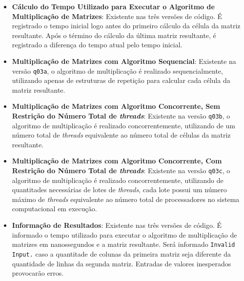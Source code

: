\begin{itemize}
{\begin{itemize}
{\begin{enumerate}
				\item{Com o tamanho da matriz $B$ definido, devem ser fornecidos $p \times q$ números inteiros. Tais números são os valores contidos na matriz $B$.}
			\end{enumerate}}
			\item{\textbf{Cálculo do Tempo Utilizado para Executar o Algoritmo de Multiplicação de Matrizes}: Existente nas três versões de código. É registrado o tempo inicial logo antes do primeiro cálculo da célula da matriz resultante. Após o término do cálculo da última matriz resultante, é registrado a diferença do tempo atual pelo tempo inicial.}
			\item{\textbf{Multiplicação de Matrizes com Algoritmo Sequencial}: Existente na versão \texttt{q03a}, o algoritmo de multiplicação é realizado sequencialmente, utilizando apenas de estruturas de repetição para calcular cada célula da matriz resultante.}
			\item{\textbf{Multiplicação de Matrizes com Algoritmo Concorrente, Sem Restrição do Número Total de \emph{threads}}: Existente na versão \texttt{q03b}, o algoritmo de multiplicação é realizado concorrentemente, utilizando de um número total de \emph{threads} equivalente ao número total de células da matriz resultante.}
			\item{\textbf{Multiplicação de Matrizes com Algoritmo Concorrente, Com Restrição do Número Total de \emph{threads}}: Existente na versão \texttt{q03c}, o algoritmo de multiplicação é realizado concorrentemente, utilizando de quantitades necessárias de lotes de \emph{threads}, cada lote possui um número máximo de \emph{threads} equivalente ao número total de processadores no sistema computacional em execução.}
			\item{\textbf{Informação de Resultados}: Existente nas três versões de código. É informado o tempo utilizado para executar o algoritmo de multiplicação de matrizes em nanossegundos e a matriz resultante. Será informado \texttt{Invalid Input.} caso a quantitade de colunas da primeira matriz seja diferente da quantidade de linhas da segunda matriz. Entradas de valores inesperados provocarão erros.}
		\end{itemize}
	}
\end{itemize}
